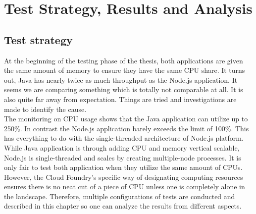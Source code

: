 \chapter{Test Strategy, Results and Analysis}
\section{Test strategy}
At the beginning of the testing phase of the thesis, both applications are given the same amount of memory to ensure they have the same CPU share. It turns out, Java has nearly twice as much throughput as the Node.js application. It seems we are comparing something which is totally not comparable at all. It is also quite far away from expectation. Things are tried and investigations are made to identify the cause. \\
The monitoring on CPU usage shows that the Java application can utilize up to 250\%. In contrast the Node.js application barely exceeds the limit of 100\%. This has everything to do with the single-threaded architecture of Node.js platform. While Java application is through adding CPU and memory vertical scalable, Node.js is single-threaded and scales by creating multiple-node processes. It is only fair to test both application when they utilize the same amount of CPUs. However, the Cloud Foundry's specific way of designating computing resources ensures there is no neat cut of a piece of CPU unless one is completely alone in the landscape. Therefore, multiple configurations of tests are conducted and described in this chapter so one can analyze the results from different aspects.  \\

